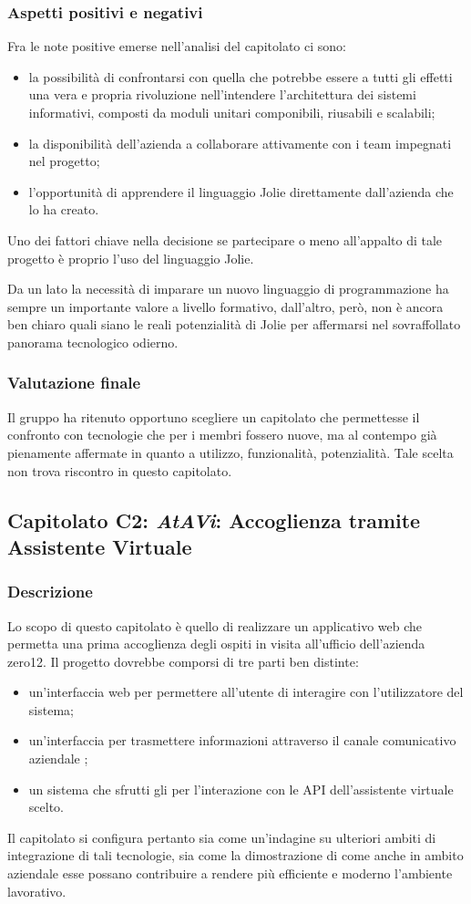 		\subsubsection{Aspetti positivi e negativi}
		Fra le note positive emerse nell'analisi del capitolato ci sono:
		\begin{itemize}
			\item la possibilità di confrontarsi con quella che potrebbe essere a tutti gli effetti una vera e propria rivoluzione nell'intendere 
			l'architettura dei sistemi informativi, composti da moduli unitari componibili, riusabili e scalabili;
			\item la disponibilità dell'azienda a collaborare attivamente con i team impegnati nel progetto;
			\item l'opportunità di apprendere il linguaggio Jolie direttamente dall'azienda che lo ha creato.
		\end{itemize}
		Uno dei fattori chiave nella decisione se partecipare o meno all'appalto di tale progetto è proprio l'uso del linguaggio Jolie.

		Da un lato la necessità di imparare un nuovo linguaggio di programmazione ha sempre un importante valore a livello formativo, dall'altro, però, non è ancora ben chiaro quali siano le reali potenzialità di Jolie per affermarsi nel sovraffollato panorama tecnologico odierno.
		\subsubsection{Valutazione finale}
		Il gruppo \hx{} ha ritenuto opportuno scegliere un capitolato che permettesse il confronto con tecnologie che per i membri fossero nuove, ma al contempo già pienamente affermate in quanto a utilizzo, funzionalità, potenzialità. Tale scelta non trova riscontro in questo capitolato.
		
	\subsection{Capitolato C2: \emph{AtAVi}: Accoglienza tramite Assistente Virtuale}
		\subsubsection{Descrizione}
		Lo scopo di questo capitolato è quello di realizzare un applicativo web che permetta una prima accoglienza degli ospiti in visita all'ufficio dell'azienda zero12. Il progetto dovrebbe comporsi di tre parti ben distinte: 
		\begin{itemize}
			\item un'interfaccia web per permettere all'utente di interagire con l'utilizzatore del sistema;
			\item un'interfaccia per trasmettere informazioni attraverso il canale comunicativo aziendale ;
			\item un sistema che sfrutti gli  per l'interazione con le API dell'assistente virtuale scelto.
		\end{itemize}
		Il capitolato si configura pertanto sia come un'indagine su ulteriori ambiti di integrazione di tali tecnologie, sia come la dimostrazione di come anche in ambito aziendale esse possano contribuire a rendere più efficiente e moderno l'ambiente lavorativo.
